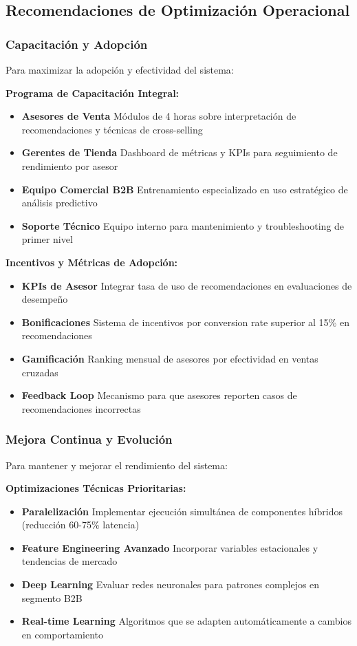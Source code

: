 \documentclass[twocolumn]{article}
\begin{document}
\subsection{Recomendaciones de Optimización Operacional}

\subsubsection{Capacitación y Adopción}

Para maximizar la adopción y efectividad del sistema:

\textbf{Programa de Capacitación Integral:}
\begin{itemize}
    \item \textbf{Asesores de Venta} Módulos de 4 horas sobre interpretación de recomendaciones y técnicas de cross-selling
    \item \textbf{Gerentes de Tienda} Dashboard de métricas y KPIs para seguimiento de rendimiento por asesor
    \item \textbf{Equipo Comercial B2B} Entrenamiento especializado en uso estratégico de análisis predictivo
    \item \textbf{Soporte Técnico} Equipo interno para mantenimiento y troubleshooting de primer nivel
\end{itemize}

\textbf{Incentivos y Métricas de Adopción:}
\begin{itemize}
    \item \textbf{KPIs de Asesor} Integrar tasa de uso de recomendaciones en evaluaciones de desempeño
    \item \textbf{Bonificaciones} Sistema de incentivos por conversion rate superior al 15\% en recomendaciones
    \item \textbf{Gamificación} Ranking mensual de asesores por efectividad en ventas cruzadas
    \item \textbf{Feedback Loop} Mecanismo para que asesores reporten casos de recomendaciones incorrectas
\end{itemize}

\subsubsection{Mejora Continua y Evolución}

Para mantener y mejorar el rendimiento del sistema:

\textbf{Optimizaciones Técnicas Prioritarias:}
\begin{itemize}
    \item \textbf{Paralelización} Implementar ejecución simultánea de componentes híbridos (reducción 60-75\% latencia)
    \item \textbf{Feature Engineering Avanzado} Incorporar variables estacionales y tendencias de mercado
    \item \textbf{Deep Learning} Evaluar redes neuronales para patrones complejos en segmento B2B
    \item \textbf{Real-time Learning} Algoritmos que se adapten automáticamente a cambios en comportamiento
\end{itemize}
\end{document}
